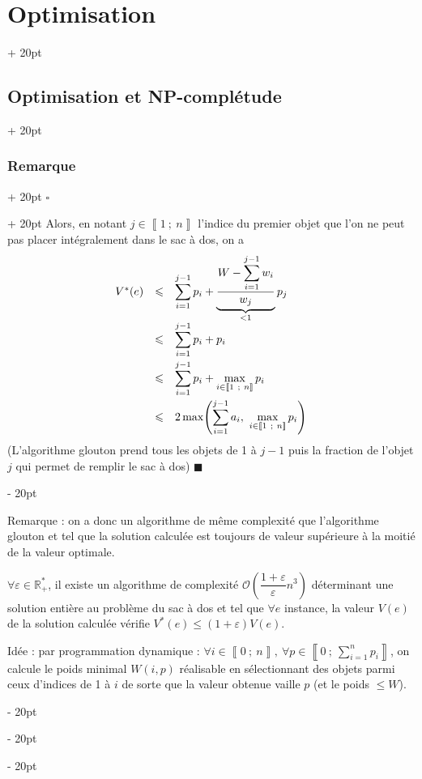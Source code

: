 \documentclass[a4paper, 12pt, twoside]{article}
\newcommand{\R}{\mathbb{R}} %
\newcommand{\nset}[2]{\left\llbracket #1\ ;\ #2 \right\rrbracket}
\newcommand{\lr}[1]{\left( #1 \right)}
\renewcommand{\le}{\leqslant}
\newcommand{\ind}[1][20pt]{\advance\leftskip + #1}
\newcommand{\deind}[1][20pt]{\advance\leftskip - #1}
\newenvironment{indt}[2][20pt]{#2 \par \ind[#1]}{\par \deind} %
\newenvironment{proof}[1][{}]{\begin{indt}{$\square$ #1}}{$\blacksquare$ \end{indt}}
\newcommand{\1}{\mathbbm 1}
\begin{document}
\begin{indt}{\section{Optimisation}}
\begin{indt}{\subsection{Optimisation et \textbf{NP}-complétude}}
\begin{indt}{\subsubsection{Remarque}}
\begin{proof}
                    Alors, en notant $j \in \nset 1 n$ l'indice du premier objet que l'on ne peut pas placer intégralement dans le sac à dos, on a
                    \[
                        \begin{array}{rcl}
                            V^*(e)
                            &\le& \displaystyle
                            \sum_{i = 1}^{j - 1} p_i
                            + \underbrace{\dfrac{\displaystyle W - \sum_{i = 1}^{j - 1} w_i}{w_j}}_{< 1} p_j
                            \\
                            &\le& \displaystyle
                            \sum_{i = 1}^{j - 1} p_i + p_i
                            \vspace{3pt}
                            \\
                            &\le& \displaystyle
                            \sum_{i = 1}^{j - 1} p_i + \max_{i \in \nset 1 n} p_i
                            \vspace{3pt}
                            \\
                            &\le& \displaystyle
                            2 \max\!\lr{\sum_{i = 1}^{j - 1} a_i,\ \max_{i \in \nset 1 n} p_i}
                        \end{array}
                    \]
                    (L'algorithme glouton prend tous les objets de 1 à $j - 1$ puis la fraction de l'objet $j$ qui permet de remplir le sac à dos)
                \end{proof}

                \vspace{12pt}
                
                Remarque : on a donc un algorithme de même complexité que l'algorithme glouton et tel que la solution calculée est toujours de valeur supérieure à la moitié de la valeur optimale.

                \vspace{12pt}
                
                 $\forall \varepsilon \in \R^*_+$, il existe un algorithme de complexité $\mathcal O\!\lr{\dfrac{1 + \varepsilon}{\varepsilon} n^3}$ déterminant une solution entière au problème du sac à dos et tel que $\forall e$ instance, la valeur $V(e)$ de la solution calculée vérifie $V^*(e) \le (1 + \varepsilon)V(e)$.

                Idée : par programmation dynamique : $\forall i \in \nset 0 n,\ \forall p \in \nset{0}{\displaystyle \sum_{i = 1}^n p_i}$, on calcule le poids minimal $W(i, p)$ réalisable en sélectionnant des objets parmi ceux d'indices de 1 à $i$ de sorte que la valeur obtenue vaille $p$ (et le poids $\le W$).


\end{indt}
\end{indt}
\end{indt}
\end{document}
